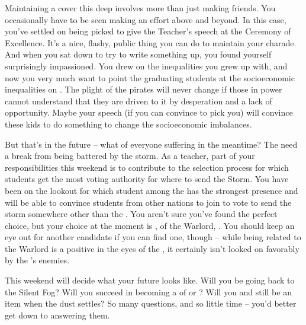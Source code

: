 \documentclass[char]{GL2020}
\begin{document}
Maintaining a cover this deep involves more than just making friends. You occasionally have to be seen making an effort above and beyond. In this case, you've settled on being picked to give the Teacher's speech at the Ceremony of Excellence. It's a nice, flashy, public thing you can do to maintain your charade. And when you sat down to try to write something up, you found yourself surprisingly impassioned. You drew on the inequalities you grew up with, and now you very much want to point the graduating students at the socioeconomic inequalities on \pEarth{}. The plight of the pirates will never change if those in power cannot understand that they are driven to it by desperation and a lack of opportunity. Maybe your speech (if you can convince \cMusic{\full} to pick you) will convince these kids to do something to change the socioeconomic imbalances. 

But that's in the future -- what of everyone suffering in the meantime? The \pShippies{} need a break from being battered by the storm. As a teacher, part of your responsibilities this weekend is to contribute to the selection process for which students get the most voting authority for where to send the Storm. You have been on the lookout for which student among the \pShippies{} has the strongest presence and will be able to convince students from other nations to join to vote to send the storm somewhere other than the \pShip{}. You aren't sure you've found the perfect choice, but your choice at the moment is \cWarlordDaughter{\full}, \cWarlordDaughter{\child} of the \pShip{} Warlord, \cLoud{\full}. You should keep an eye out for another candidate if you can find one, though -- while being related to the Warlord is a positive in the eyes of the \pShip{}, it certainly isn't looked on favorably by the \pShip{}'s enemies.

This weekend will decide what your future looks like. Will you be going back to the Silent Fog? Will you succeed in becoming a \cPirate{\cleric} of \cEbb{} or \cFlow{}? Will you and \cPrince{} still be an item when the dust settles? So many questions, and so little time  -- you'd better get down to answering them.
\end{document}
